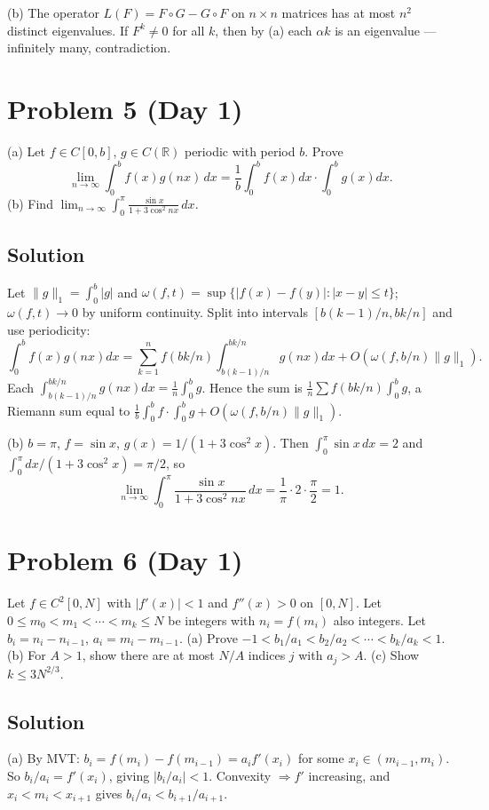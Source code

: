 \documentclass{article}
\begin{document}
(b) The operator $L(F) = F\circ G - G\circ F$ on $n\times n$ matrices has at most $n^2$ distinct eigenvalues. If $F^k \neq 0$ for all $k$, then by (a) each $\alpha k$ is an eigenvalue — infinitely many, contradiction.

\section*{Problem 5 (Day 1)}
(a) Let $f \in C[0,b]$, $g \in C(\mathbb{R})$ periodic with period $b$. Prove
\[
\lim_{n\to\infty}\int_0^b f(x)g(nx)\,dx = \frac{1}{b}\int_0^b f(x)dx \cdot \int_0^b g(x)dx.
\]
(b) Find $\lim_{n\to\infty}\int_0^\pi \frac{\sin x}{1 + 3\cos^2 nx}\,dx$.

\subsection*{Solution}
Let $\|g\|_1 = \int_0^b |g|$ and $\omega(f,t) = \sup\{|f(x)-f(y)| : |x-y|\leq t\}$; $\omega(f,t)\to 0$ by uniform continuity. Split into intervals $[b(k-1)/n, bk/n]$ and use periodicity:
\[
\int_0^b f(x)g(nx)dx = \sum_{k=1}^n f(bk/n)\int_{b(k-1)/n}^{bk/n} g(nx)dx + O(\omega(f,b/n)\|g\|_1).
\]
Each $\int_{b(k-1)/n}^{bk/n}g(nx)dx = \frac{1}{n}\int_0^b g$. Hence the sum is $\frac{1}{n}\sum f(bk/n) \int_0^b g$, a Riemann sum equal to $\frac{1}{b}\int_0^b f \cdot \int_0^b g + O(\omega(f,b/n)\|g\|_1)$.

(b) $b = \pi$, $f = \sin x$, $g(x) = 1/(1 + 3\cos^2 x)$. Then $\int_0^\pi \sin x\,dx = 2$ and $\int_0^\pi dx/(1+3\cos^2 x) = \pi/2$, so
\[
\lim_{n\to\infty}\int_0^\pi \frac{\sin x}{1+3\cos^2 nx}\,dx = \frac{1}{\pi} \cdot 2 \cdot \frac{\pi}{2} = 1.
\]

\section*{Problem 6 (Day 1)}
Let $f \in C^2[0, N]$ with $|f'(x)| < 1$ and $f''(x) > 0$ on $[0, N]$. Let $0 \leq m_0 < m_1 < \cdots < m_k \leq N$ be integers with $n_i = f(m_i)$ also integers. Let $b_i = n_i - n_{i-1}$, $a_i = m_i - m_{i-1}$.
(a) Prove $-1 < b_1/a_1 < b_2/a_2 < \cdots < b_k/a_k < 1$.
(b) For $A > 1$, show there are at most $N/A$ indices $j$ with $a_j > A$.
(c) Show $k \leq 3 N^{2/3}$.

\subsection*{Solution}
(a) By MVT: $b_i = f(m_i) - f(m_{i-1}) = a_i f'(x_i)$ for some $x_i \in (m_{i-1}, m_i)$. So $b_i/a_i = f'(x_i)$, giving $|b_i/a_i| < 1$. Convexity $\Rightarrow f'$ increasing, and $x_i < m_i < x_{i+1}$ gives $b_i/a_i < b_{i+1}/a_{i+1}$.
\end{document}
